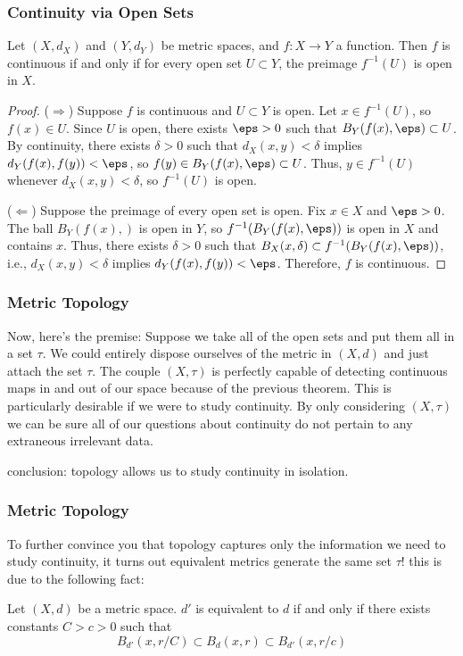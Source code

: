 \documentclass{beamer}
\begin{document}
\begin{frame}
    \frametitle{Continuity via Open Sets}

    \begin{theorem}
        Let $(X, d_X)$ and $(Y, d_Y)$ be metric spaces, and $f\colon X \to Y$ a function. Then $f$ is continuous if and only if for every open set $U \subset Y$, the preimage $f^{-1}(U)$ is open in $X$.
    \end{theorem}

    \begin{proof}
        ($\Rightarrow$) Suppose $f$ is continuous and $U \subset Y$ is open. \pause Let $x \in f^{-1}(U)$, so $f(x) \in U$. Since $U$ is 
        open, there exists $\eps > 0$ such that $B_Y(f(x), \eps) \subset U$. \pause By continuity, there exists $\delta > 0$ 
        such that $d_X(x, y) < \delta$ implies $d_Y(f(x), f(y)) < \eps$, so $f(y) \in B_Y(f(x), \eps) \subset U$. Thus, 
        $y \in f^{-1}(U)$ whenever $d_X(x, y) < \delta$, so $f^{-1}(U)$ is open.

        ($\Leftarrow$) Suppose the preimage of every open set is open. Fix $x \in X$ and $\eps > 0$. \pause The ball $B_Y(f(x), )$ is 
        open in $Y$, so $f^{-1}(B_Y(f(x), \eps))$ is open in $X$ and contains $x$. \pause Thus, there exists $\delta > 0$ such that 
        $B_X(x, \delta) \subset f^{-1}(B_Y(f(x), \eps))$, i.e., $d_X(x, y) < \delta$ implies $d_Y(f(x), f(y)) < \eps$. Therefore, 
        $f$ is continuous.
    \end{proof}
\end{frame}

\begin{frame}
    \frametitle{Metric Topology}

    Now, here's the premise: Suppose we take all of the open sets and put them all in a set $\tau$. We could entirely \alert{dispose} ourselves 
    of the metric in $(X, d)$ and just attach the set \alert{$\tau$}. The couple $(X, \tau)$ is perfectly capable of \alert{detecting} continuous maps 
    in and out of our space because of the previous theorem. \pause This is particularly desirable if we were to study continuity. 
    By only considering $(X, \tau)$ we can be sure all of our questions about continuity do not pertain to any extraneous irrelevant data. \pause

    conclusion: topology allows us to study continuity in isolation.

\end{frame}

\begin{frame}
    \frametitle{Metric Topology}

    To further convince you that topology captures only the information we need to study continuity, it turns out \alert{equivalent metrics generate
    the same set $\tau$!} \pause this is due to the following fact:
    \begin{lemma}
        Let $(X, d)$ be a metric space. $d'$ is equivalent to $d$ if and only if there exists constants $C>c>0$ such that
        \[B_{d'}(x, r/C)\subset B_{d}(x, r) \subset B_{d'}(x, r/c)\]
    \end{lemma}
    
\end{frame}
\end{document}
